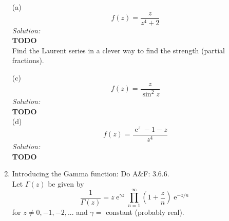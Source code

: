 \documentclass[10pt]{amsart}
\DeclareMathOperator{\E}{e}
\theoremstyle{nonumberplain}
\begin{document}
\begin{enumerate}[label={\bf {\arabic*}:}]
\noindent
(a)
$$
f(z) = \frac z {z^4 + 2}
$$
\textit{Solution:} \\
\textbf{TODO} \\
Find the Laurent series in a clever way to find the strength (partial fractions).

\noindent
(c)
$$
f(z) = \frac z {\sin^2 z}
$$
\textit{Solution:} \\
\textbf{TODO} \\

\noindent
(d)
$$
f(z) = \frac {\E^z - 1 - z}{z^4}
$$
\textit{Solution:} \\
\textbf{TODO} \\
\newpage

\item Introducing the Gamma function: Do A\&F: 3.6.6. \\

\noindent
Let $\Gamma(z)$ be given by
$$
\frac 1 {\Gamma(z)} = z \E^{\gamma z} \prod_{n=1}^\infty \left( 1 + \frac z n \right) \E^{-z / n}
$$
for $z \neq 0, -1, -2, ...$ and $\gamma = $ constant (probably real). \\


\end{enumerate}
\end{document}
